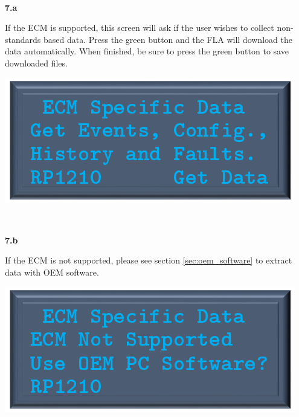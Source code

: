 \documentclass[11pt, oneside]{book}
\begin{document}
\\[\baselineskip]
\noindent\begin{minipage}{0.45\textwidth}%
\begin{center}
\textbf{7.a}\\[\baselineskip]
\end{center}
If the ECM is supported, this screen will ask if the user wishes to collect non-standards based data. Press the green button and the FLA
will download the data automatically. When finished, be sure to press the green button to save downloaded files.
\end{minipage}%
\hfill%
\begin{minipage}{0.45\textwidth}
\includegraphics[width=\linewidth]{../media/pstricks_files/16_ecm_specific_supported}
\end{minipage}
\\[\baselineskip]
\noindent\begin{minipage}{0.45\textwidth}%
\begin{center}
\textbf{7.b}\\[\baselineskip]
\end{center}
If the ECM is not supported, please see section \ref{sec:oem_software} to extract data with OEM software.
\end{minipage}%
\hfill%
\begin{minipage}{0.45\textwidth}
\includegraphics[width=\linewidth]{../media/pstricks_files/16_ecm_specific_data}
\end{minipage}
\end{document}

